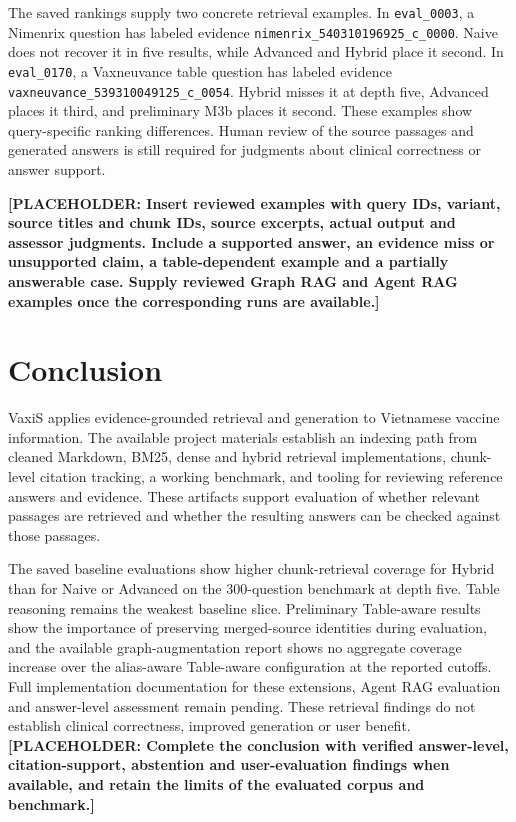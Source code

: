 \documentclass[oneside]{sn-jnl}
\newcommand{\pending}[1]{\textbf{\textcolor{red!65!black}{[PLACEHOLDER: #1]}}}
\newcommand{\artifact}[1]{\nolinkurl{#1}}
\begin{document}
The saved rankings supply two concrete retrieval examples. In \artifact{eval_0003}, a Nimenrix question has labeled evidence \artifact{nimenrix_540310196925_c_0000}. Naive does not recover it in five results, while Advanced and Hybrid place it second. In \artifact{eval_0170}, a Vaxneuvance table question has labeled evidence \artifact{vaxneuvance_539310049125_c_0054}. Hybrid misses it at depth five, Advanced places it third, and preliminary M3b places it second. These examples show query-specific ranking differences. Human review of the source passages and generated answers is still required for judgments about clinical correctness or answer support.

\pending{Insert reviewed examples with query IDs, variant, source titles and chunk IDs, source excerpts, actual output and assessor judgments. Include a supported answer, an evidence miss or unsupported claim, a table-dependent example and a partially answerable case. Supply reviewed Graph RAG and Agent RAG examples once the corresponding runs are available.}

\section{Conclusion}
VaxiS applies evidence-grounded retrieval and generation to Vietnamese vaccine information. The available project materials establish an indexing path from cleaned Markdown, BM25, dense and hybrid retrieval implementations, chunk-level citation tracking, a working benchmark, and tooling for reviewing reference answers and evidence. These artifacts support evaluation of whether relevant passages are retrieved and whether the resulting answers can be checked against those passages.

The saved baseline evaluations show higher chunk-retrieval coverage for Hybrid than for Naive or Advanced on the 300-question benchmark at depth five. Table reasoning remains the weakest baseline slice. Preliminary Table-aware results show the importance of preserving merged-source identities during evaluation, and the available graph-augmentation report shows no aggregate coverage increase over the alias-aware Table-aware configuration at the reported cutoffs. Full implementation documentation for these extensions, Agent RAG evaluation and answer-level assessment remain pending. These retrieval findings do not establish clinical correctness, improved generation or user benefit.
\pending{Complete the conclusion with verified answer-level, citation-support, abstention and user-evaluation findings when available, and retain the limits of the evaluated corpus and benchmark.}
\end{document}
